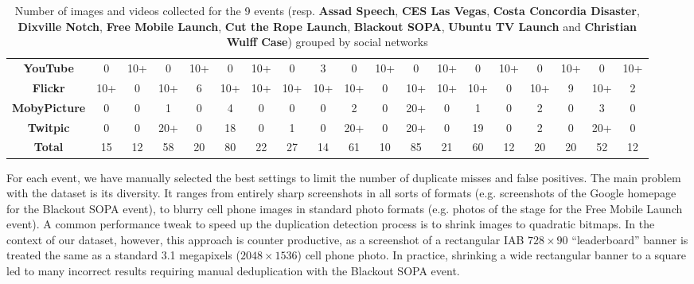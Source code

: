 \documentclass{acm_proc_article-sp}
\begin{document}
\begin{table}[htbp]
{{\begin{tabular}{|c|c|c|c|c|c|c|c|c|c|c|c|c|c|c|c|c|c|c|}
    \textbf{YouTube} & 0 & 10+ & 0 & 10+ & 0 & 10+ & 0 & 3 & 0 & 10+ & 0 & 10+ & 0 & 10+ & 0 & 10+ & 0 & 10+\\
    \textbf{Flickr} & 10+ & 0 & 10+ & 6 & 10+ & 10+ & 10+ & 10+ & 10+ & 0 & 10+ & 10+ & 10+ & 0 & 10+ & 9 & 10+ & 2\\
    \textbf{MobyPicture} & 0 & 0 & 1 & 0 & 4 & 0 & 0 & 0 & 2 & 0 & 20+ & 0 & 1 & 0 & 2 & 0 & 3 & 0\\
    \textbf{Twitpic} & 0 & 0 & 20+ & 0 & 18 & 0 & 1 & 0 & 20+ & 0 & 20+ & 0 & 19 & 0 & 2 & 0 & 20+ & 0\\
    \hline
    \textbf{Total} & 15 & 12 & 58 & 20 & 80 & 22 & 27 & 14 & 61 & 10 & 85 & 21 & 60 & 12 & 20 & 20 & 52 & 12\\
    \hline
  \end{tabular}
  }
  \label{tab:number-media}
  \caption{Number of images and videos collected for the 9 events (resp. \textbf{Assad Speech}, \textbf{CES Las Vegas}, \textbf{Costa Concordia Disaster}, \textbf{Dixville Notch}, \textbf{Free Mobile Launch}, \textbf{Cut the Rope Launch}, \textbf{Blackout SOPA}, \textbf{Ubuntu TV Launch} and \textbf{Christian Wulff Case}) grouped by social networks}
  }
\end{table}
For each event, we have manually selected the best settings to limit the number of duplicate misses and false positives. The main problem with the dataset is its diversity. It ranges from entirely sharp screenshots in all sorts of formats (e.g. screenshots of the Google homepage for the Blackout SOPA event), to blurry cell phone images in standard photo formats (e.g. photos of the stage for the Free Mobile Launch event). A common performance tweak to speed up the duplication detection process is to shrink images to quadratic bitmaps. In the context of our dataset, however, this approach is counter productive, as a screenshot of a rectangular IAB $728 \times 90$ ``leaderboard'' banner is treated the same as a standard 3.1 megapixels ($2048 \times 1536$) cell phone photo. In practice, shrinking a wide rectangular banner to a square led to many incorrect results requiring manual deduplication with the Blackout SOPA event.
\end{document}

